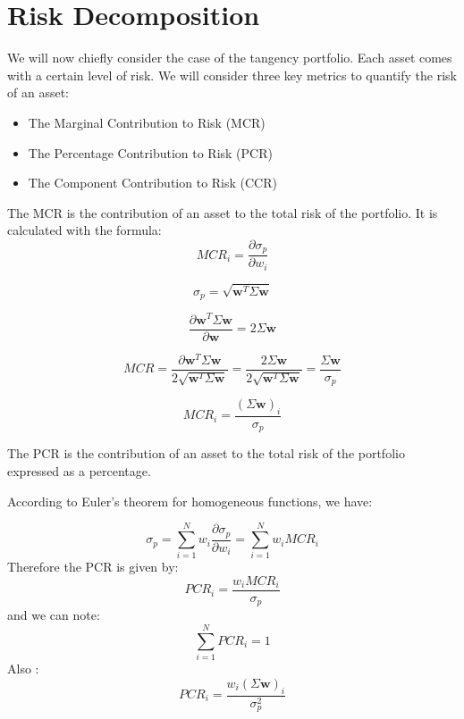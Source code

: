 \documentclass[11pt,a4paper]{article}
\begin{document}
\section{Risk Decomposition}
We will now chiefly consider the case of the tangency portfolio.
Each asset comes with a certain level of risk.
We will consider three key metrics to quantify the risk of an asset:
\begin{itemize}
    \item The Marginal Contribution to Risk (MCR)
    \item The Percentage Contribution to Risk (PCR)
    \item The Component Contribution to Risk (CCR)
\end{itemize}

The MCR is the contribution of an asset to the total risk of the portfolio. It is calculated with the formula:
\begin{equation}
MCR_i = \frac{\partial \sigma_p}{\partial w_i}
\end{equation}

\begin{equation}
\sigma_p = \sqrt{\mathbf{w}^T \Sigma \mathbf{w}}
\end{equation}

\begin{equation}
\frac{\partial \mathbf{w}^T \Sigma \mathbf{w}}{\partial \mathbf{w}} = 2 \Sigma \mathbf{w}
\end{equation}

\begin{equation}
MCR = \frac{\partial \mathbf{w}^T \Sigma \mathbf{w}}{2 \sqrt{\mathbf{w}^T \Sigma \mathbf{w}}} = \frac{2 \Sigma \mathbf{w}}{2 \sqrt{\mathbf{w}^T \Sigma \mathbf{w}}} = \frac{\Sigma \mathbf{w}}{\sigma_p}
\end{equation}

\begin{equation}
MCR_i = \frac{(\Sigma \mathbf{w})_i}{\sigma_p}
\end{equation}

The PCR is the contribution of an asset to the total risk of the portfolio expressed as a percentage.

According to Euler's theorem for homogeneous functions, we have:

\begin{equation}
\sigma_p = \sum_{i=1}^N w_i \frac{\partial \sigma_p}{\partial w_i} = \sum_{i=1}^N w_i MCR_i
\end{equation}
Therefore the PCR is given by:
\begin{equation}
PCR_i = \frac{w_i MCR_i}{\sigma_p}
\end{equation}
and we can note:
\begin{equation}
\sum_{i=1}^N PCR_i = 1
\end{equation}
Also :
\begin{equation}
    PCR_i = \frac{w_i (\Sigma \mathbf{w})_i}{\sigma_p^2}
\end{equation}
\end{document}

